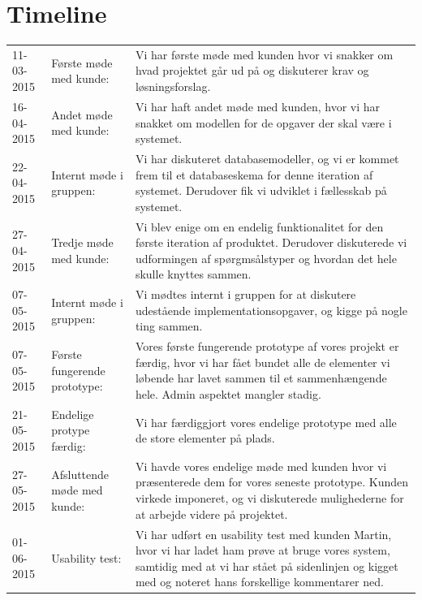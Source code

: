 \documentclass[11pt, a4paper]{article}
\begin{document}
\section{Timeline}
\label{sec:timeline}
\begin{tabular}{p{} p{} p{}}
11-03-2015 & Første møde med kunde: & Vi har første møde med kunden hvor vi snakker om hvad projektet går ud på og diskuterer krav og løsningsforslag. \\
16-04-2015 & Andet møde med kunde: & Vi har haft andet møde med kunden, hvor vi har snakket om modellen for de opgaver der skal være i systemet. \\
22-04-2015 & Internt møde i gruppen: & Vi har diskuteret databasemodeller, og vi er kommet frem til et databaseskema for denne iteration af systemet. Derudover fik vi udviklet i fællesskab på systemet. \\
27-04-2015 & Tredje møde med kunde: & Vi blev enige om en endelig funktionalitet for den første iteration af produktet. Derudover diskuterede vi udformingen af spørgmsålstyper og hvordan det hele skulle knyttes sammen. \\
07-05-2015 & Internt møde i gruppen: & Vi mødtes internt i gruppen for at diskutere udestående implementationsopgaver, og kigge på nogle ting sammen. \\
07-05-2015 & Første fungerende prototype: & Vores første fungerende prototype af vores projekt er færdig, hvor vi har fået bundet alle de elementer vi løbende har lavet sammen til et sammenhængende hele. Admin aspektet mangler stadig. \\
21-05-2015 & Endelige protype færdig: & Vi har færdiggjort vores endelige prototype med alle de store elementer på plads. \\
27-05-2015 & Afsluttende møde med kunde: & Vi havde vores endelige møde med kunden hvor vi præsenterede dem for vores seneste prototype. Kunden virkede imponeret, og vi diskuterede mulighederne for at arbejde videre på projektet. \\
01-06-2015 & Usability test: & Vi har udført en usability test med kunden Martin, hvor vi har ladet ham prøve at bruge vores system, samtidig med at vi har stået på sidenlinjen og kigget med og noteret hans forskellige kommentarer ned. \\ 
\end{tabular}

\newpage


{}
\end{document}
